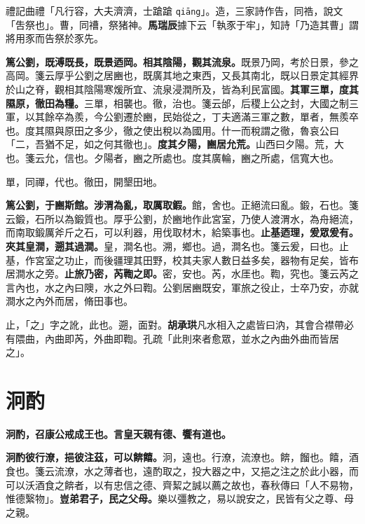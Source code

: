 \begin{quoting}禮記曲禮「凡行容，大夫濟濟，士蹌蹌 \texttt{qiāng}」。造，三家詩作告，同祰，說文「吿祭也」。曹，同䄚，祭猪神。\textbf{馬瑞辰}據下云「執豕于牢」，知詩「乃造其曹」謂將用豕而告祭於豕先。\end{quoting}

\textbf{篤公劉，既溥既長，既景迺岡。相其陰陽，觀其流泉。}{\footnotesize 既景乃岡，考於日景，參之高岡。箋云厚乎公劉之居豳也，既廣其地之東西，又長其南北，既以日景定其經界於山之脊，觀相其陰陽寒煖所宜、流泉浸潤所及，皆為利民富國。}\textbf{其軍三單，度其隰原，徹田為糧。}{\footnotesize 三單，相襲也。徹，治也。箋云邰，后稷上公之封，大國之制三軍，以其餘卒為羨，今公劉遷於豳，民始從之，丁夫適滿三軍之數，單者，無羨卒也。度其隰與原田之多少，徹之使出稅以為國用。什一而稅謂之徹，魯哀公曰「二，吾猶不足，如之何其徹也」。}\textbf{度其夕陽，豳居允荒。}{\footnotesize 山西曰夕陽。荒，大也。箋云允，信也。夕陽者，豳之所處也。度其廣輪，豳之所處，信寬大也。}

\begin{quoting}單，同禪，代也。徹田，開墾田地。\end{quoting}

\textbf{篤公劉，于豳斯館。涉渭為亂，取厲取鍜。}{\footnotesize 館，舍也。正絕流曰亂。鍛，石也。箋云鍛，石所以為鍛質也。厚乎公劉，於豳地作此宮室，乃使人渡渭水，為舟絕流，而南取鍛厲斧斤之石，可以利器，用伐取材木，給築事也。}\textbf{止基迺理，爰眾爰有。夾其皇澗，遡其過澗。}{\footnotesize 皇，澗名也。溯，鄉也。過，澗名也。箋云爰，曰也。止基，作宮室之功止，而後疆理其田野，校其夫家人數日益多矣，器物有足矣，皆布居澗水之旁。}\textbf{止旅乃密，芮鞫之即。}{\footnotesize 密，安也。芮，水厓也。鞫，究也。箋云芮之言內也，水之內曰隩，水之外曰鞫。公劉居豳既安，軍旅之役止，士卒乃安，亦就澗水之內外而居，脩田事也。}

\begin{quoting}止，「之」字之訛，此也。遡，面對。\textbf{胡承珙}凡水相入之處皆曰汭，其會合襟帶必有隈曲，內曲即芮，外曲即鞫。孔疏「此則來者愈眾，並水之內曲外曲而皆居之」。\end{quoting}

\section{泂酌}


\textbf{泂酌，召康公戒成王也。言皇天親有德、饗有道也。}

\textbf{泂酌彼行潦，挹彼注茲，可以餴饎。}{\footnotesize 泂，遠也。行潦，流潦也。餴，餾也。饎，酒食也。箋云流潦，水之薄者也，遠酌取之，投大器之中，又挹之注之於此小器，而可以沃酒食之餴者，以有忠信之德、齊絜之誠以薦之故也，春秋傳曰「人不易物，惟德繄物」。}\textbf{豈弟君子，民之父母。}{\footnotesize 樂以彊教之，易以說安之，民皆有父之尊、母之親。}

